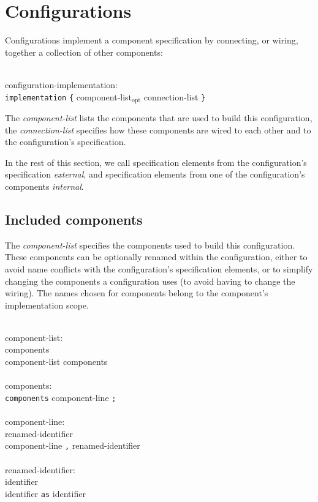 \documentclass[11pt]{article}
\newcommand{\kw}[1]{{\tt #1}}
\newcommand{\opt}{$_{\mbox{opt}}$\xspace}
\begin{document}
\section{Configurations}
\label{sec:configuration}

Configurations implement a component specification by connecting, or wiring,
together a collection of other components:
\em \begin{tabbing}
\hspace*{2cm}\= \\ \kill
configuration-implementation:\\
\>	\kw{implementation} \kw{\{} component-list\opt connection-list \kw{\}}\\
\end{tabbing} \rm

The \emph{component-list} lists the components that are used to build this
configuration, the \emph{connection-list} specifies how these components
are wired to each other and to the configuration's specification.

In the rest of this section, we call specification elements from the
configuration's specification \emph{external},
and specification elements from one of the configuration's components
\emph{internal}.

\subsection{Included components}
\label{sec:config-components}

The \emph{component-list} specifies the components used to build this
configuration. These components can be optionally renamed within the
configuration, either to avoid name conflicts with the configuration's
specification elements, or to simplify changing the components a
configuration uses (to avoid having to change the wiring). The names
chosen for components belong to the component's implementation scope.

\em \begin{tabbing}
\hspace*{2cm}\= \\ \kill
component-list:\\
\>	components\\
\>	component-list components\\
\\
components:\\
\>	\kw{components} component-line \kw{;}\\
\\
component-line:\\
\>	renamed-identifier\\
\>	component-line \kw{,} renamed-identifier\\
\\
renamed-identifier:\\
\>	identifier\\
\>	identifier \kw{as} identifier\\
\end{tabbing} \rm
\end{document}
